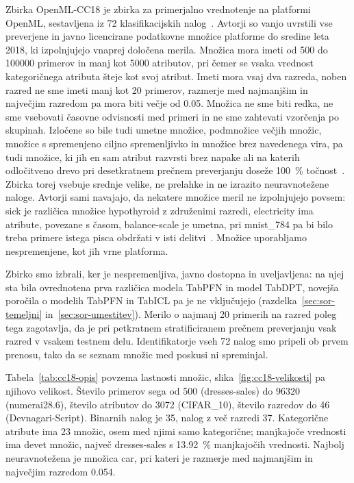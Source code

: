 \documentclass[a4paper,12pt,openright]{book}
\begin{document}
Zbirka OpenML-CC18 je zbirka za primerjalno vrednotenje na platformi OpenML,
sestavljena iz 72
klasifikacijskih nalog~\cite{bischl2021openml}. Avtorji so vanjo uvrstili vse
preverjene in javno licencirane podatkovne množice platforme do sredine leta
2018, ki izpolnjujejo vnaprej določena merila. Množica mora imeti od 500 do
\num{100000} primerov in manj kot 5000 atributov, pri čemer se vsaka vrednost
kategoričnega atributa šteje kot svoj atribut. Imeti mora vsaj dva razreda,
noben razred ne sme imeti manj kot 20 primerov, razmerje med najmanjšim in
največjim razredom pa mora biti večje od \num{0.05}. Množica ne sme biti
redka, ne sme vsebovati časovne odvisnosti med primeri in ne sme zahtevati
vzorčenja po skupinah. Izločene so bile tudi umetne množice, podmnožice večjih
množic, množice s spremenjeno ciljno spremenljivko in množice brez navedenega
vira, pa tudi množice, ki jih en sam atribut razvrsti brez napake ali na
katerih odločitveno drevo pri desetkratnem prečnem preverjanju doseže
\SI{100}{\percent} točnost~\cite{bischl2021openml}. Zbirka torej vsebuje srednje velike, ne
prelahke in ne izrazito neuravnotežene naloge. Avtorji sami navajajo, da
nekatere množice meril ne izpolnjujejo povsem: sick je različica množice
hypothyroid z združenimi razredi, electricity ima atribute, povezane s časom,
balance-scale je umetna, pri mnist\_784 pa bi bilo treba primere istega pisca
obdržati v isti delitvi~\cite{bischl2021openml}. Množice uporabljamo
nespremenjene, kot jih vrne platforma.

Zbirko smo izbrali, ker je nespremenljiva, javno dostopna in uveljavljena: na
njej sta bila ovrednotena prva različica modela TabPFN in model TabDPT,
novejša poročila o modelih TabPFN in TabICL pa je ne vključujejo
(razdelka~\ref{sec:sor-temeljni} in~\ref{sec:sor-umestitev}). Merilo o
najmanj 20 primerih na razred poleg tega zagotavlja, da je pri petkratnem
stratificiranem prečnem preverjanju vsak razred v vsakem testnem delu.
Identifikatorje vseh 72 nalog smo pripeli ob prvem prenosu, tako da se
seznam množic med poskusi ni spreminjal.

Tabela~\ref{tab:cc18-opis} povzema lastnosti množic, slika~\ref{fig:cc18-velikosti}
pa njihovo velikost. Število primerov sega od 500 (dresses-sales) do
\num{96320} (numerai28.6), število atributov do 3072 (CIFAR\_10), število
razredov do 46 (Devnagari-Script). Binarnih nalog je 35, nalog z več razredi
37. Kategorične atribute ima 23 množic, osem med njimi samo kategorične;
manjkajoče vrednosti ima devet množic, največ dresses-sales s
\SI{13.92}{\percent} manjkajočih vrednosti. Najbolj neuravnotežena je množica
car, pri kateri je razmerje med najmanjšim in največjim razredom \num{0.054}.
\end{document}
